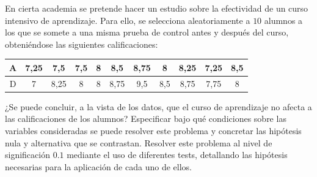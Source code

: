 \documentclass[12pt]{article}
\begin{document}
    \begin{ejercicio}[1,1 puntos]
        En cierta academia se pretende hacer un estudio sobre la efectividad de un curso
        intensivo de aprendizaje. Para ello, se selecciona aleatoriamente a $10$ alumnos a los
        que se somete a una misma prueba de control antes y después del curso, obteniéndose
        las siguientes calificaciones:

        \begin{center}
            \begin{tabular}{c|cccccccccc}
                A & 7,25 & 7,5 & 7,5 & 8 & 8,5 & 8,75 & 8 & 8,25 & 7,25 & 8,5 \\
                \hline
                D & 7 & 8,25 & 8 & 8 & 8,75 & 9,5 & 8,5 & 8,75 & 7,75 & 8
            \end{tabular}
        \end{center}

        ¿Se puede concluir, a la vista de los datos, que el curso de aprendizaje no afecta a
        las calificaciones de los alumnos? Especificar bajo qué condiciones sobre las variables
        consideradas se puede resolver este problema y concretar las hipótesis nula y alternativa
        que se contrastan. Resolver este problema al nivel de significación $0{.}1$ mediante el
        uso de diferentes tests, detallando las hipótesis necesarias para la aplicación de cada
        uno de ellos.
    \end{ejercicio}

    \newpage

    \setcounter{ejercicio}{0}
\end{document}
